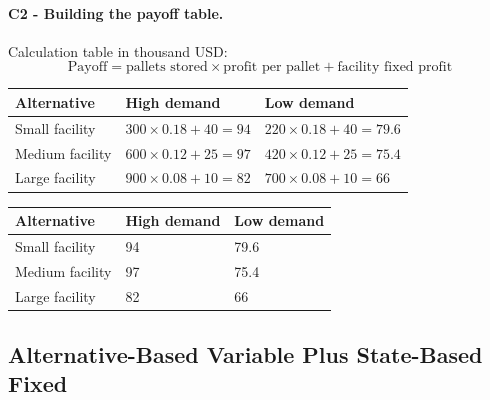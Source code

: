 
	\paragraph*{C2 - Building the payoff table.}
	\label{subsec:problem17-cold-storage-contracts-c2}
	Calculation table in thousand USD:
	\[
	\text{Payoff}=\text{pallets stored}\times\text{profit per pallet}+\text{facility fixed profit}
	\]
	\begin{center}
		\begin{tabular}{lll}
			\toprule
			Alternative & High demand & Low demand \\
			\midrule
			Small facility & $300 \times 0.18 + 40 = 94$ & $220 \times 0.18 + 40 = 79.6$ \\
			Medium facility & $600 \times 0.12 + 25 = 97$ & $420 \times 0.12 + 25 = 75.4$ \\
			Large facility & $900 \times 0.08 + 10 = 82$ & $700 \times 0.08 + 10 = 66$ \\
			\bottomrule
		\end{tabular}
	\end{center}

	\begin{center}
		\begin{tabular}{lll}
			\toprule
			Alternative & High demand & Low demand \\
			\midrule
			Small facility & 94 & 79.6 \\
			Medium facility & 97 & 75.4 \\
			Large facility & 82 & 66 \\
			\bottomrule
		\end{tabular}
	\end{center}


	\subsection{Alternative-Based Variable Plus State-Based Fixed}
	\label{sec:alternative-based-variable-payoff-plus-state-based-fixed-payoff}


